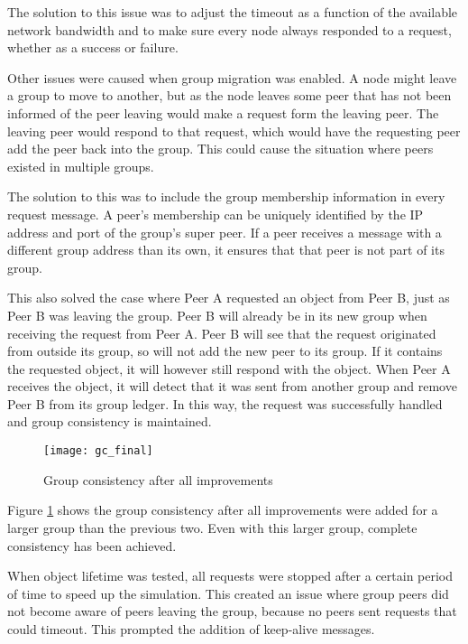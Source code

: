 The solution to this issue was to adjust the timeout as a function of the available network bandwidth and to make sure every node always responded to a request, whether as a success or failure.

Other issues were caused when group migration was enabled. A node might leave a group to move to another, but as the node leaves some peer that has not been informed of the peer leaving would make a request form the leaving peer. The leaving peer would respond to that request, which would have the requesting peer add the peer back into the group. This could cause the situation where peers existed in multiple groups.

The solution to this was to include the group membership information in every request message. A peer's membership can be uniquely identified by the IP address and port of the group's super peer. If a peer receives a message with a different group address than its own, it ensures that that peer is not part of its group.

This also solved the case where Peer A requested an object from Peer B, just as Peer B was leaving the group. Peer B will already be in its new group when receiving the request from Peer A. Peer B will see that the request originated from outside its group, so will not add the new peer to its group. If it contains the requested object, it will however still respond with the object. When Peer A receives the object, it will detect that it was sent from another group and remove Peer B from its group ledger. In this way, the request was successfully handled and group consistency is maintained.

    \begin{figure}[htbp]
 \centering
 \texttt{[image: gc\_final]}
 \caption{Group consistency after all improvements}
 \label{fig_gc_final}
\end{figure}

Figure \ref{fig_gc_final} shows the group consistency after all improvements were added for a larger group than the previous two. Even with this larger group, complete consistency has been achieved.

When object lifetime was tested, all requests were stopped after a certain period of time to speed up the simulation. This created an issue where group peers did not become aware of peers leaving the group, because no peers sent requests that could timeout. This prompted the addition of keep-alive messages.

